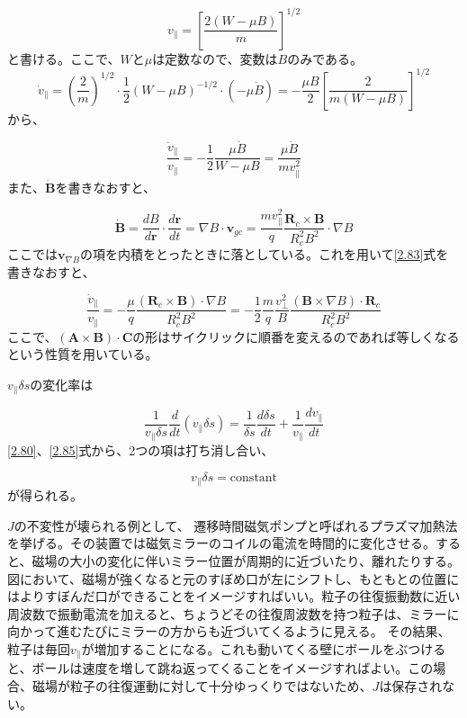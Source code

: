 \documentclass{ltjsarticle}
\numberwithin{equation}{section} %
\begin{document}
\begin{equation}
  v_\parallel = \left[\frac{2(W-\mu B)}{m}\right]^{1/2} \label{2.82}
\end{equation}
と書ける。ここで、$W$と$\mu$は定数なので、変数は$B$のみである。
\[
  \dot{v}_\parallel = \left(\frac{2}{m}\right)^{1/2}\cdot \frac{1}{2}(W-\mu B)^{-1/2}\cdot (-\mu \dot{B}) = -\frac{\mu B}{2}\left[\frac{2}{m(W-\mu B)}\right]^{1/2}
\]
から、

\begin{equation}
  \frac{\dot{v}_\parallel}{v_\parallel} = -\frac{1}{2}\frac{\mu \dot{B}}{W-\mu B} = \frac{\mu \dot{B}}{mv^2_\parallel} \label{2.83}
\end{equation}
また、$\dot{\bm{B}}$を書きなおすと、

\begin{equation}
  \dot{\bm{B}} = \frac{dB}{d\bm{r}}\cdot \frac{d\bm{r}}{dt} = \nabla B\cdot \bm{v}_{gc} = \frac{mv^2_\parallel}{q}\frac{\bm{R}_c\times \bm{B}}{R^2_cB^2}\cdot \nabla B \label{2.84}
\end{equation}
ここでは$\bm{v}_{\nabla B}$の項を内積をとったときに落としている。これを用いて\eqref{2.83}式を書きなおすと、

\begin{equation}
  \frac{\dot{v}_\parallel}{v_\parallel} = -\frac{\mu}{q}\frac{(\bm{R}_c \times \bm{B})\cdot \nabla B}{R^2_cB^2} = -\frac{1}{2}\frac{m}{q}\frac{v^2_\perp}{B}\frac{(\bm{B}\times \nabla B)\cdot \bm{R}_c}{R^2_cB^2} \label{2.85}
\end{equation}
ここで、$(\bm{A}\times \bm{B})\cdot \bm{C}$の形はサイクリックに順番を変えるのであれば等しくなるという性質を用いている。

$v_\parallel \delta s$の変化率は

\begin{equation}
  \frac{1}{v_\parallel \delta s}\frac{d}{dt}(v_\parallel \delta s) = \frac{1}{\delta s}\frac{d\delta s}{dt} + \frac{1}{v_\parallel}\frac{dv_\parallel}{dt} \label{2.86}
\end{equation}
\eqref{2.80}、\eqref{2.85}式から、2つの項は打ち消し合い、

\begin{equation}
  v_\parallel \delta s = \text{constant} \label{2.87}
\end{equation}
が得られる。

$J$の不変性が壊られる例として、 遷移時間磁気ポンプと呼ばれるプラズマ加熱法を挙げる。その装置では磁気ミラーのコイルの電流を時間的に変化させる。すると、磁場の大小の変化に伴いミラー位置が周期的に近づいたり、離れたりする。
図において、磁場が強くなると元のすぼめ口が左にシフトし、もともとの位置にはよりすぼんだ口ができることをイメージすればいい。粒子の往復振動数に近い周波数で振動電流を加えると、ちょうどその往復周波数を持つ粒子は、ミラーに向かって進むたびにミラーの方からも近づいてくるように見える。
その結果、粒子は毎回$v_\parallel$が増加することになる。これも動いてくる壁にボールをぶつけると、ボールは速度を増して跳ね返ってくることをイメージすればよい。この場合、磁場が粒子の往復運動に対して十分ゆっくりではないため、$J$は保存されない。
\end{document}
